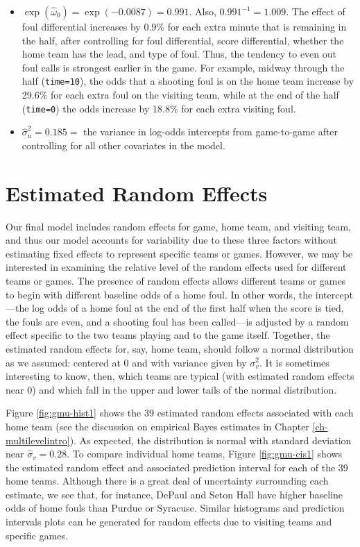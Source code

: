 \documentclass[
]{krantz}
\begin{document}
\begin{itemize}
\item
  \(\exp(\hat{\omega}_{0})=\exp(-0.0087)=0.991\). Also, \(0.991^{-1}=1.009\). The effect of foul differential increases by 0.9\% for each extra minute that is remaining in the half, after controlling for foul differential, score differential, whether the home team has the lead, and type of foul. Thus, the tendency to even out foul calls is strongest earlier in the game. For example, midway through the half (\texttt{time=10}), the odds that a shooting foul is on the home team increase by 29.6\% for each extra foul on the visiting team, while at the end of the half (\texttt{time=0}) the odds increase by 18.8\% for each extra visiting foul.
\item
  \(\hat{\sigma}_{u}^{2}=0.185=\) the variance in log-odds intercepts from game-to-game after controlling for all other covariates in the model.
\end{itemize}

\section{Estimated Random Effects}\label{estimatedRE}

Our final model includes random effects for game, home team, and visiting team, and thus our model accounts for variability due to these three factors without estimating fixed effects to represent specific teams or games. However, we may be interested in examining the relative level of the random effects used for different teams or games. The presence of random effects allows different teams or games to begin with different baseline odds of a home foul. In other words, the intercept---the log odds of a home foul at the end of the first half when the score is tied, the fouls are even, and a shooting foul has been called---is adjusted by a random effect specific to the two teams playing and to the game itself. Together, the estimated random effects for, say, home team, should follow a normal distribution as we assumed: centered at 0 and with variance given by \(\sigma_{v}^{2}\). It is sometimes interesting to know, then, which teams are typical (with estimated random effects near 0) and which fall in the upper and lower tails of the normal distribution.

Figure \ref{fig:gmu-hist1} shows the 39 estimated random effects associated with each home team (see the discussion on empirical Bayes estimates  in Chapter \ref{ch-multilevelintro}). As expected, the distribution is normal with standard deviation near \(\hat{\sigma}_{v}=0.28\). To compare individual home teams, Figure \ref{fig:gmu-cis1} shows the estimated random effect and associated prediction interval for each of the 39 home teams. Although there is a great deal of uncertainty surrounding each estimate, we see that, for instance, DePaul and Seton Hall have higher baseline odds of home fouls than Purdue or Syracuse. Similar histograms and prediction intervals plots can be generated for random effects due to visiting teams and specific games.
\end{document}
